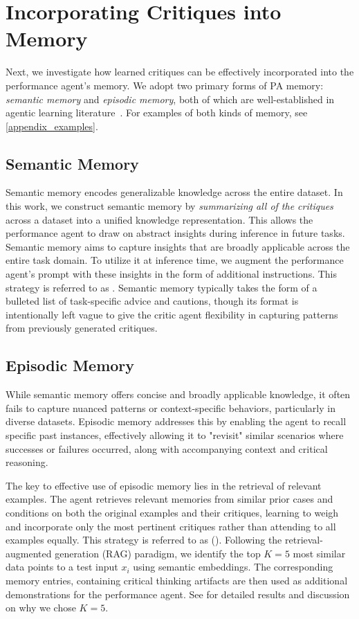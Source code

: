 \section{Incorporating Critiques into Memory}

Next, we investigate how learned critiques can be effectively incorporated into the performance agent’s memory. We adopt two primary forms of PA memory: \textit{semantic memory} and \textit{episodic memory}, both of which are well-established in agentic learning literature~\cite{sumers2024cognitive}. For examples of both kinds of memory, see \cref{appendix_examples}.

\subsection{Semantic Memory}

Semantic memory encodes generalizable knowledge across the entire dataset. In this work, we construct semantic memory by \textit{summarizing all of the critiques} across a dataset into a unified knowledge representation. This allows the performance agent to draw on abstract insights during inference in future tasks.
Semantic memory aims to capture insights that are broadly applicable across the entire task domain. To utilize it at inference time, we augment the performance agent’s prompt with these insights in the form of additional instructions. This strategy is referred to as \SEMCRIT{}.
Semantic memory typically takes the form of a bulleted list of task-specific advice and cautions, though its format is intentionally left vague to give the critic agent flexibility in capturing patterns from previously generated critiques.

\subsection{Episodic Memory}

While semantic memory offers concise and broadly applicable knowledge, it often fails to capture nuanced patterns or context-specific behaviors, particularly in diverse datasets. Episodic memory addresses this by enabling the agent to recall specific past instances, effectively allowing it to "revisit" similar scenarios where successes or failures occurred, along with accompanying context and critical reasoning.

The key to effective use of episodic memory lies in the retrieval of relevant examples. The agent retrieves relevant memories from similar prior cases and conditions on both the original examples and their critiques, learning to weigh and incorporate only the most pertinent critiques rather than attending to all examples equally. This strategy is referred to as (\EPCRIT{}). Following the retrieval-augmented generation (RAG) paradigm, we identify the top $K=5$ most similar data points to a test input $x_i$ using semantic embeddings. The corresponding memory entries, containing critical thinking artifacts are then used as additional demonstrations for the performance agent. See  for detailed results and discussion on why we chose $K=5$.

